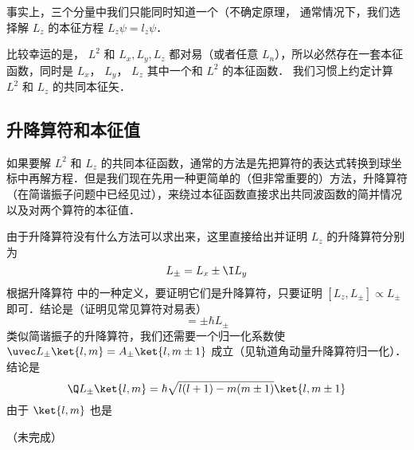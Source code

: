 事实上，三个分量中我们只能同时知道一个（不确定原理，%
通常情况下，我们选择解 $L_z$ 的本征方程 $L_z \psi = l_z\psi$． 

比较幸运的是， $L^2$ 和 $L_x, L_y, L_z$ 都对易（或者任意 $L_n$），所以必然存在一套本征函数，同时是 $L_x$， $L_y$，  $L_z$ 其中一个和 $L^2$ 的本征函数． 我们习惯上约定计算 $L^2$ 和 $L_z$ 的共同本征矢．

\subsection{升降算符和本征值}

如果要解 $L^2$ 和 $L_z$ 的共同本征函数，通常的方法是先把算符的表达式转换到球坐标中再解方程．但是我们现在先用一种更简单的（但非常重要的）方法，升降算符（在简谐振子问题中已经见过），来绕过本征函数直接求出共同波函数的简并情况以及对两个算符的本征值．

由于升降算符没有什么方法可以求出来，这里直接给出并证明 $L_z$ 的升降算符分别为
\begin{equation}
L_\pm = L_x \pm \I L_y
\end{equation}
根据升降算符 中的一种定义，要证明它们是升降算符，只要证明 $[L_z, L_\pm] \propto L_\pm$ 即可．结论是（证明见常见算符对易表）%
\begin{equation}
[L_z, L_\pm] =  \pm \hbar L_ \pm
\end{equation}
类似简谐振子的升降算符，我们还需要一个归一化系数使 $\uvec L_\pm \ket{l,m} = A_ \pm \ket{l,m \pm 1}$ 成立（见轨道角动量升降算符归一化）．结论是
\begin{equation}
\Q L_\pm \ket{l, m}  = \hbar \sqrt{l(l + 1) - m(m \pm 1)} \ket{l, m \pm 1} 
\end{equation}
由于 $\ket{l,m}$ 也是

（未完成）
